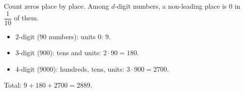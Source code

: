Count zeros place by place. Among $d$-digit numbers, a non-leading place is $0$ in $\dfrac{1}{10}$ of them.
\begin{itemize}
\item $2$-digit ($90$ numbers): units $0$: $9$.
\item $3$-digit ($900$): tens and units: $2\cdot90=180$.
\item $4$-digit ($9000$): hundreds, tens, units: $3\cdot900=2700$.
\end{itemize}
Total: $9+180+2700=\boxed{2889}$.
